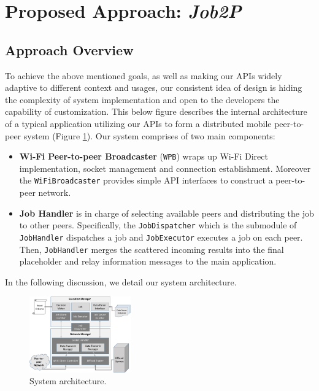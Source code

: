\documentclass[conference]{IEEEtran}
\begin{document}
\section{Proposed Approach: \emph{Job2P}}
\label{sec:approach}

\subsection{Approach Overview}
To achieve the above mentioned goals, as well as making our APIs widely adaptive to different context and usages, our consistent idea of design is hiding the complexity of system implementation and open to the developers the capability of customization. This below figure describes the internal architecture of a typical application utilizing our APIs to form a distributed mobile peer-to-peer system (Figure \ref{fig:architecture}). Our system comprises of two main components:

\begin{itemize}
	\item \textbf{Wi-Fi Peer-to-peer Broadcaster} (\texttt{WPB}) wraps up Wi-Fi Direct implementation, socket management and connection establishment. Moreover the \texttt{WiFiBroadcaster} provides simple API interfaces to construct a peer-to-peer network.
	\item \textbf{Job Handler} is in charge of selecting available peers and distributing the job to other peers. Specifically, the \texttt{JobDispatcher} which is the submodule of \texttt{JobHandler} dispatches a job and \texttt{JobExecutor} executes a job on each peer. Then, \texttt{JobHandler} merges the scattered incoming results into the final placeholder and relay information messages to the main application.
\end{itemize}

In the following discussion, we detail our system architecture.

\begin{figure}
\centerline {
\includegraphics[width=0.39\textwidth, natwidth=643, natheight=559]{data/jobShareArch}
}
\caption{System architecture.}
\label{fig:architecture}
\end{figure}
\end{document}
